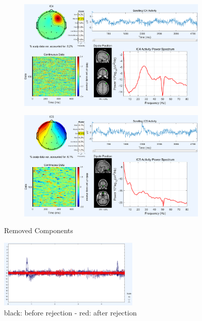 \documentclass[hidelinks,12pt]{article}
\begin{document}
	\newpage
	
	\begin{figure}[!h]
		\centering
		\begin{subfigure}{0.4\textwidth}
			\centering
			\includegraphics[width=\linewidth]{mc/4}
		\end{subfigure}
		\hspace{1cm}
		\begin{subfigure}{0.4\textwidth}
			\centering
			\includegraphics[width=\linewidth]{mc/5}
		\end{subfigure}
		\caption{Removed Components}
	\end{figure}
	
	\begin{figure}[h!]
		\centering
		\includegraphics[width=0.6\textwidth]{40}
		\caption{black: before rejection - red: after rejection}
	\end{figure}
	
\end{document}

